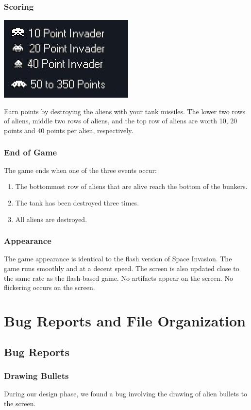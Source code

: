\documentclass[11pt,letter,oneside]{report}
\begin{document}
\subsection{Scoring}
\includegraphics[]{scoring.jpg}

Earn points by destroying the aliens with your tank missiles. The lower two rows of aliens, middle two rows of aliens, and the top row of aliens are worth 10, 20 points and 40 points per alien, respectively.

\subsection{End of Game}
The game ends when one of the three events occur:
\begin{enumerate}
\item{} The bottommost row of aliens that are alive reach the bottom of the bunkers.
\item{} The tank has been destroyed three times.
\item{} All aliens are destroyed.
\end{enumerate}

\subsection{Appearance}
The game appearance is identical to the flash version of Space Invasion. The game runs smoothly and at a decent speed. The screen is also updated close to the same rate as the flash-based game. No artifacts appear on the screen. No flickering occurs on the screen.

\chapter{Bug Reports and File Organization}

\section{Bug Reports}

\subsection{Drawing Bullets}
During our design phase, we found a bug involving the drawing of alien bullets to the screen. 
\end{document}
